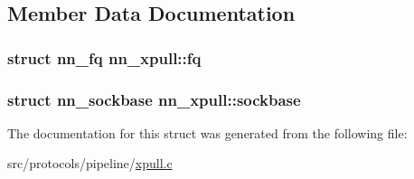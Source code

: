 \subsection{Member Data Documentation}
\subsubsection[{fq}]{\setlength{\rightskip}{0pt plus 5cm}struct {\bf nn\+\_\+fq} nn\+\_\+xpull\+::fq}\hypertarget{structnn__xpull_aaf4412eaae57eef0a4773453fcfe65d3}{}\label{structnn__xpull_aaf4412eaae57eef0a4773453fcfe65d3}
\subsubsection[{sockbase}]{\setlength{\rightskip}{0pt plus 5cm}struct {\bf nn\+\_\+sockbase} nn\+\_\+xpull\+::sockbase}\hypertarget{structnn__xpull_a99136496008d6c7a9399c96f00c85433}{}\label{structnn__xpull_a99136496008d6c7a9399c96f00c85433}


The documentation for this struct was generated from the following file\+:\begin{DoxyCompactItemize}
\item 
src/protocols/pipeline/\hyperlink{xpull_8c}{xpull.\+c}\end{DoxyCompactItemize}
